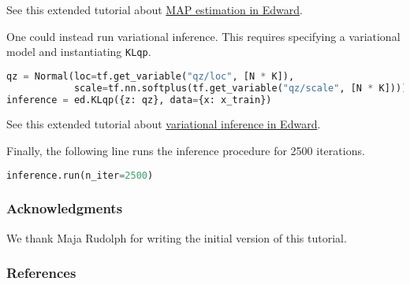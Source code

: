 See this extended tutorial about
\href{/tutorials/map}{MAP estimation in Edward}.

One could instead run variational inference. This requires specifying
a variational model and instantiating \texttt{KLqp}.
\begin{lstlisting}[language=Python]
qz = Normal(loc=tf.get_variable("qz/loc", [N * K]),
            scale=tf.nn.softplus(tf.get_variable("qz/scale", [N * K])))
inference = ed.KLqp({z: qz}, data={x: x_train})
\end{lstlisting}
See this extended tutorial about
\href{/tutorials/variational-inference}{variational inference in Edward}.

Finally, the following line runs the inference procedure for 2500
iterations.
\begin{lstlisting}[language=Python]
inference.run(n_iter=2500)
\end{lstlisting}

\subsubsection{Acknowledgments}

We thank Maja Rudolph for writing the initial version of this
tutorial.

\subsubsection{References}

